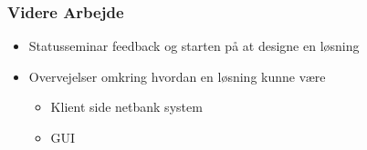 
\begin{frame}
\frametitle{Videre Arbejde}
    \begin{itemize}
        \item{Statusseminar feedback og starten på at designe en løsning}
        \vspace{\baselineskip}
        \item{Overvejelser omkring hvordan en løsning kunne være}
        \begin{itemize}
        	\item{Klient side netbank system}
        	\item{GUI}
        \end{itemize}	
    \end{itemize}
\end{frame}
    
